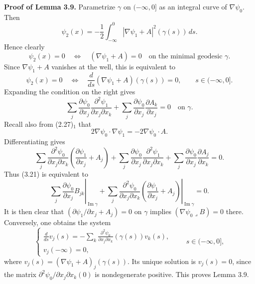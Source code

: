 \documentclass[11pt]{article}
\newcommand{\dd}{\,d}
\begin{document}
\noindent\textbf{Proof of Lemma 3.9.}
Parametrize $\gamma$ on $(-\infty,0]$ as an integral curve of $\nabla\psi_0$. Then
\begin{equation}
\psi_2(x)=-\frac12\int_{-\infty}^0
|\nabla\psi_1+A|^2(\gamma(s))\dd s.
\tag{3.18}
\end{equation}
Hence clearly
\begin{equation}
\psi_2(x)=0
\quad\Longleftrightarrow\quad
(\nabla\psi_1+A)=0\quad\text{on the minimal geodesic }\gamma.
\tag{3.19}
\end{equation}
Since $\nabla\psi_1+A$ vanishes at the well, this is equivalent to
\begin{equation}
\psi_2(x)=0
\quad\Longleftrightarrow\quad
\frac{d}{ds}(\nabla\psi_1+A)(\gamma(s))=0,
\qquad s\in(-\infty,0].
\tag{3.20}
\end{equation}
Expanding the condition on the right gives
\begin{equation}
\sum_j\frac{\partial\psi_0}{\partial x_j}
\frac{\partial^2\psi_1}{\partial x_j\partial x_k}
+\sum_j\frac{\partial\psi_0}{\partial x_j}\frac{\partial A_k}{\partial x_j}=0
\quad\text{on }\gamma.
\tag{3.21}
\end{equation}
Recall also from (2.27)$_1$ that
\[
2\nabla\psi_0\cdot\nabla\psi_1=-2\nabla\psi_0\cdot A.
\]
Differentiating gives
\begin{equation}
\sum_j\frac{\partial^2\psi_0}{\partial x_j\partial x_k}
\left(\frac{\partial\psi_1}{\partial x_j}+A_j\right)
+\sum_j\frac{\partial\psi_0}{\partial x_j}
\frac{\partial^2\psi_1}{\partial x_j\partial x_k}
+\sum_j\frac{\partial\psi_0}{\partial x_j}\frac{\partial A_j}{\partial x_k}=0.
\tag{3.22}
\end{equation}
Thus (3.21) is equivalent to
\begin{equation}
\left.\sum_j\frac{\partial\psi_0}{\partial x_j}B_{jk}\right|_{\operatorname{Im}\gamma}
+\left.\sum_j\frac{\partial^2\psi_0}{\partial x_j\partial x_k}
\left(\frac{\partial\psi_1}{\partial x_j}+A_j\right)\right|_{\operatorname{Im}\gamma}=0.
\tag{3.23}
\end{equation}
It is then clear that $(\partial\psi_1/\partial x_j+A_j)=0$ on $\gamma$ implies $(\nabla\psi_0\mathbin{\lrcorner}B)=0$ there. Conversely, one obtains the system
\[
\begin{cases}
\displaystyle\frac{d}{ds}v_j(s)
=-\sum_k\frac{\partial^2\psi_0}{\partial x_j\partial x_k}(\gamma(s))v_k(s),\\[1.2ex]
v_j(-\infty)=0,
\end{cases}
\qquad s\in(-\infty,0],
\]
where $v_j(s)=(\nabla\psi_1+A)_j(\gamma(s))$. Its unique solution is $v_j(s)=0$, since the matrix $\partial^2\psi_0/\partial x_j\partial x_k(0)$ is nondegenerate positive. This proves Lemma 3.9.
\end{document}
